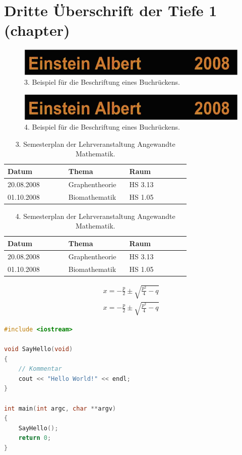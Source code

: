 \documentclass[MMR,Master,ngerman]{twbook}%
\begin{document}
\chapter{Dritte Überschrift der Tiefe 1 (chapter)}
\begin{figure}[!htbp]
\centering
\includegraphics[width=0.5\linewidth]{PICs/buchruecken}
\caption{3. Beispiel für die Beschriftung eines Buchrückens.}\label{Abb3}
\end{figure}
\begin{figure}[!htbp]
\centering
\includegraphics[width=0.5\linewidth]{PICs/buchruecken}
\caption{4. Beispiel für die Beschriftung eines Buchrückens.}\label{Abb4}
\end{figure}


\begin{table}[!htbp]
\centering
\caption{3. Semesterplan der Lehrveranstaltung \glqq Angewandte Mathematik\grqq.}\label{tab3}
\begin{tabular}{| p{0.3\linewidth} | p{0.3\linewidth} | p{0.3\linewidth} |}\hline
Datum & Thema & Raum\\\hline
20.08.2008 & Graphentheorie & HS 3.13\\
01.10.2008 & Biomathematik & HS 1.05\\\hline
\end{tabular}
\end{table}
\begin{table}[!htbp]
\centering
\caption{4. Semesterplan der Lehrveranstaltung \glqq Angewandte Mathematik\grqq.}\label{tab4}
\begin{tabular}{| p{0.3\linewidth} | p{0.3\linewidth} | p{0.3\linewidth} |}\hline
Datum & Thema & Raum\\\hline
20.08.2008 & Graphentheorie & HS 3.13\\
01.10.2008 & Biomathematik & HS 1.05\\\hline
\end{tabular}
\end{table}

\begin{align}
x = -\frac{p}{2}\pm\sqrt{\frac{p^2}{4}-q}\label{Gl3}
\end{align}
\begin{align}
x = -\frac{p}{2}\pm\sqrt{\frac{p^2}{4}-q}\label{Gl4}
\end{align}
\begin{lstlisting}[language=C++,name={2. Beispiel},label={sc:bsp:2}]
#include <iostream>

void SayHello(void)
{
    // Kommentar
    cout << "Hello World!" << endl;
}

int main(int argc, char **argv)
{
    SayHello();
    return 0;
}
\end{lstlisting}
\end{document}
